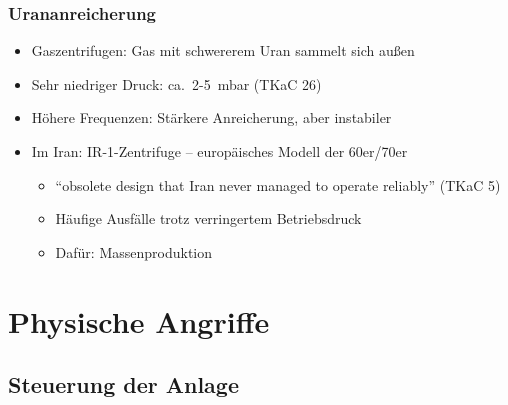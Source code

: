 \documentclass{beamer}
\begin{document}
\begin{frame}
  \frametitle{Urananreicherung}
  \begin{itemize}
    \item Gaszentrifugen: Gas mit schwererem Uran sammelt sich außen
    \item Sehr niedriger Druck: ca.~2-5~mbar (TKaC 26)
    \item Höhere Frequenzen: Stärkere Anreicherung, aber instabiler
    \item Im Iran: IR-1-Zentrifuge – europäisches Modell der 60er/70er
      \begin{itemize}
        \item ``obsolete design that Iran never managed to operate reliably'' (TKaC 5)
        \item Häufige Ausfälle trotz verringertem Betriebsdruck
        \item Dafür: Massenproduktion
      \end{itemize}
  \end{itemize}
\end{frame}

\section{Physische Angriffe}

\subsection{Steuerung der Anlage}
\end{document}
